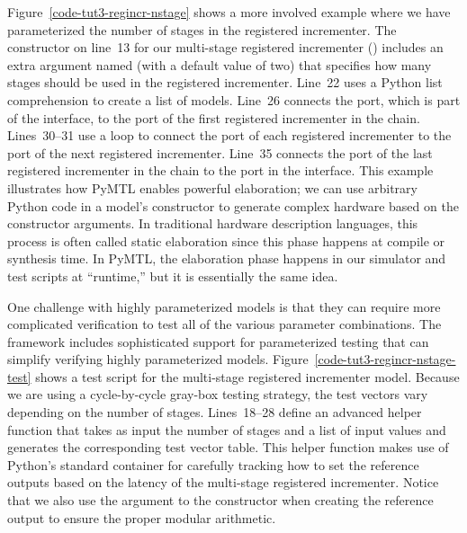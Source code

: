 \documentclass{cbxdoc}
\begin{document}
\afterpage{\clearpage}

Figure~\ref{code-tut3-regincr-nstage} shows a more involved example where
we have parameterized the number of stages in the registered incrementer.
The constructor on line~13 for our multi-stage registered incrementer
() includes an extra argument named  (with
a default value of two) that specifies how many stages should be used in
the registered incrementer. Line~22 uses a Python list comprehension to
create a list of  models. Line~26 connects the 
port, which is part of the interface, to the  port of the first
registered incrementer in the chain. Lines~30--31 use a loop to connect
the  port of each registered incrementer to the  port of
the next registered incrementer. Line~35 connects the  port of
the last registered incrementer in the chain to the  port in the
interface. This example illustrates how PyMTL enables powerful
elaboration; we can use arbitrary Python code in a model's constructor to
generate complex hardware based on the constructor arguments. In
traditional hardware description languages, this process is often called
static elaboration since this phase happens at compile or synthesis time.
In PyMTL, the elaboration phase happens in our simulator and test scripts
at ``runtime,'' but it is essentially the same idea.



One challenge with highly parameterized models is that they can require
more complicated verification to test all of the various parameter
combinations. The  framework includes sophisticated support
for parameterized testing that can simplify verifying highly
parameterized models. Figure~\ref{code-tut3-regincr-nstage-test} shows a
test script for the multi-stage registered incrementer model. Because we
are using a cycle-by-cycle gray-box testing strategy, the test vectors
vary depending on the number of stages. Lines~18--28 define an advanced
helper function that takes as input the number of stages and a list of
input values and generates the corresponding test vector table. This
helper function makes use of Python's standard  container for
carefully tracking how to set the reference outputs based on the latency
of the multi-stage registered incrementer. Notice that we also use the
 argument to the  constructor when creating the
reference output to ensure the proper modular arithmetic.
\end{document}
